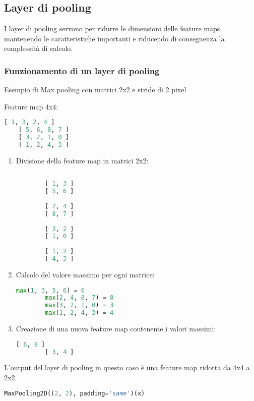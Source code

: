 \subsection{Layer di pooling}
I layer di pooling servono per ridurre le dimensioni delle feature maps mantenendo le caratteristiche importanti e riducendo di conseguenza la complessità di calcolo.
\subsubsection{Funzionamento di un layer di pooling}
Esempio di Max pooling con matrici 2x2 e stride di 2 pixel

Feature map 4x4:
\begin{lstlisting}[language=Python, frame=none]
    [ 1, 3, 2, 4 ]
    [ 5, 6, 8, 7 ]
    [ 3, 2, 1, 0 ]
    [ 1, 2, 4, 3 ]
\end{lstlisting}

\begin{enumerate}
    \item Divisione della feature map in matrici 2x2:
    \begin{lstlisting}[language=Python, frame=none]
    
        [ 1, 3 ]
        [ 5, 6 ]
        
        [ 2, 4 ]
        [ 8, 7 ]
        
        [ 3, 2 ]
        [ 1, 0 ]
        
        [ 1, 2 ]
        [ 4, 3 ]

    \end{lstlisting}
    \item Calcolo del valore massimo per ogni matrice:
    
    \begin{lstlisting}[language=Python, frame=none]
        max(1, 3, 5, 6) = 6
        max(2, 4, 8, 7) = 8
        max(3, 2, 1, 0) = 3
        max(1, 2, 4, 3) = 4
    \end{lstlisting}

    \item Creazione di una nuova feature map contenente i valori massimi:
    \begin{lstlisting}[language=Python, frame=none]
        [ 6, 8 ]
        [ 3, 4 ]
    \end{lstlisting}
\end{enumerate}
L'output del layer di pooling in questo caso è una feature map ridotta da 4x4 a 2x2.

\begin{lstlisting}[language=Python, frame=none]
    MaxPooling2D((2, 2), padding='same')(x)
\end{lstlisting}

